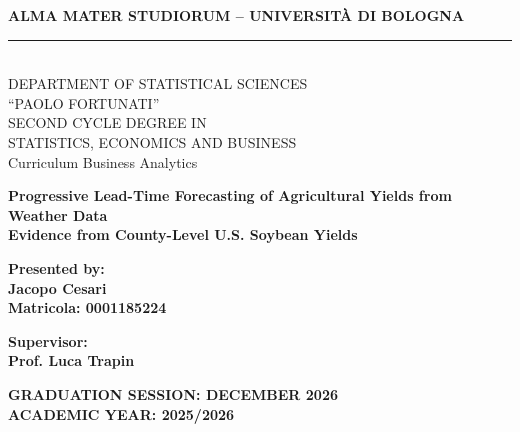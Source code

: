 \documentclass[12pt,a4paper]{report}
\begin{document}
\hypersetup{pageanchor=false}
\begin{titlepage}
    \begin{center}
        {\Large{\bf ALMA MATER STUDIORUM -- UNIVERSIT\`A DI BOLOGNA}} \\
        \vspace{0.5cm}
        \rule[0.1mm]{15cm}{0.1mm}\\
        {\Large DEPARTMENT OF STATISTICAL SCIENCES\\ ``PAOLO FORTUNATI''} \\
        \vspace{0.3cm}
        {\Large SECOND CYCLE DEGREE IN\\ STATISTICS, ECONOMICS AND BUSINESS} \\
        \vspace{0.2cm}
        {\large Curriculum Business Analytics}
        
        \vspace{25mm}
        
        {\LARGE{\bf Progressive Lead-Time Forecasting of Agricultural Yields from Weather Data}} \\[0.4cm]
        {\Large{\bf Evidence from County-Level U.S. Soybean Yields}}
    \end{center}
    
    \vspace{30mm}
    \par
    \noindent
    \begin{minipage}[t]{0.47\textwidth}
        {\large{\bf Presented by:\\
        Jacopo Cesari \\
        Matricola: 0001185224}}
    \end{minipage}
    \hfill
    \begin{minipage}[t]{0.47\textwidth}\raggedleft
        {\large{\bf Supervisor:\\
        Prof. Luca Trapin}}
    \end{minipage}
    
    \vspace{25mm}
    \begin{center}
        {\large{\bf GRADUATION SESSION: DECEMBER 2026}} \\
        \vspace{8mm}
        {\large{\bf ACADEMIC YEAR: 2025/2026}}
    \end{center}
\end{titlepage}
\end{document}
